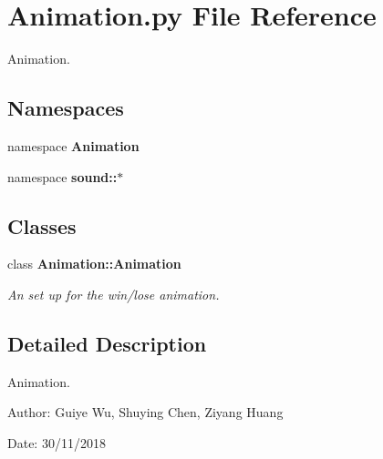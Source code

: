 \section{Animation.py File Reference}
\label{Animation_8py}
Animation. 

\subsection*{Namespaces}
\begin{CompactItemize}
\item 
namespace \textbf{Animation}
\item 
namespace \textbf{sound::$\ast$}
\end{CompactItemize}
\subsection*{Classes}
\begin{CompactItemize}
\item 
class \bf{Animation::Animation}
\begin{CompactList}\small\item\em An set up for the win/lose animation. \item\end{CompactList}\end{CompactItemize}


\subsection{Detailed Description}
Animation. 

\begin{Desc}
\item[Author:]Guiye Wu, Shuying Chen, Ziyang Huang \end{Desc}
\begin{Desc}
\item[Date:]30/11/2018 \end{Desc}
